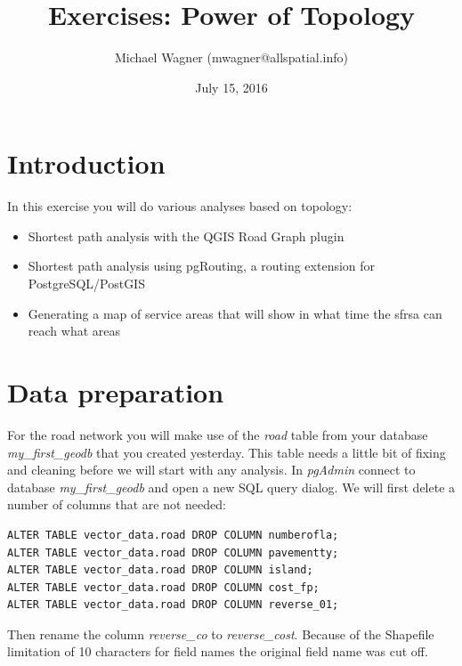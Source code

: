 \documentclass[a4paper,12pt,titlepage]{article}
\title{Exercises: Power of Topology}
\author{Michael Wagner (mwagner@allspatial.info)}
\date{July 15, 2016}
\begin{document}
\maketitle                   											%

\tableofcontents
\listoffigures
\lstlistoflistings
\newpage
\printglossary[type=\acronymtype,title={List of Abbreviations}]
\newpage

\section{Introduction}

In this exercise you will do various analyses based on topology:

\begin{itemize}
	\item Shortest path analysis with the QGIS Road Graph plugin
	\item Shortest path analysis using pgRouting, a routing extension for PostgreSQL/PostGIS
	\item Generating a map of service areas that will show in what time the \gls{sfrsa} can reach what areas
\end{itemize}


\section{Data preparation}

For the road network you will make use of the \textit{road} table from your database \textit{my\_first\_geodb} that you created yesterday. This table needs a little bit of fixing and cleaning before we will start with any analysis. In \textit{pgAdmin} connect to database \textit{my\_first\_geodb} and open a new SQL query dialog. We will first delete a number of columns that are not needed:

\begin{lstlisting}[caption={Deleting columns}]
ALTER TABLE vector_data.road DROP COLUMN numberofla;
ALTER TABLE vector_data.road DROP COLUMN pavementty;
ALTER TABLE vector_data.road DROP COLUMN island;
ALTER TABLE vector_data.road DROP COLUMN cost_fp;
ALTER TABLE vector_data.road DROP COLUMN reverse_01;
\end{lstlisting}

Then rename the column \textit{reverse\_co} to \textit{reverse\_cost}. Because of the Shapefile limitation of 10 characters for field names the original field name was cut off.
\end{document}
